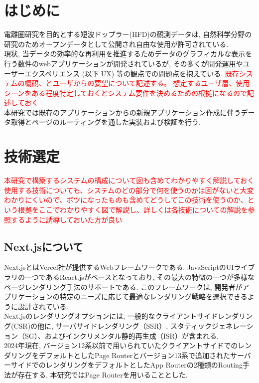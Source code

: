 \section{はじめに}
電離圏研究を目的とする短波ドップラー(HFD)の観測データは, 自然科学分野の研究のためオープンデータとして公開され自由な使用が許可されている. \\
現状, 当データの効率的な再利用を推進するためデータのグラフィカルな表示を行う数件のwebアプリケーションが開発されているが, その多くが開発運用やユーザーエクスペリエンス (以下 UX) 等の観点での問題点を抱えている. 
\textcolor{red}{既存システムの概観、とユーザからの要望について記述する。}
\textcolor{red}{想定するユーザ層、使用シーンをある程度特定しておくとシステム要件を決めるための根拠になるので記述しておく}
\\本研究では既存のアプリケーションからの新規アプリケーション作成に伴うデータ取得とページのルーティングを通した実装および検証を行う.\\


\section{技術選定}
\textcolor{red}{本研究で構築するシステムの構成について図も含めてわかりやすく解説しておく}
\textcolor{red}{使用する技術についても、システムのどの部分で何を使うのかは図がないと大変わかりにくいので、ボツになったものも含めてどうしてこの技術を使うのか、という根拠をここでわかりやすく図で解説し、詳しくは各技術についての解説を参照するように誘導しておいた方が良い}
\subsection{Next.jsについて}
Next.jsとはVercel社が提供するWebフレームワークである.
JavaScriptのUIライブラリの一つであるReact.jsがベースとなっており, その最大の特徴の一つが多様なページレンダリング手法のサポートである.
このフレームワークは, 開発者がアプリケーションの特定のニーズに応じて最適なレンダリング戦略を選択できるように設計されている. \\
Next.jsのレンダリングオプションには, 一般的なクライアントサイドレンダリング(CSR)の他に, サーバサイドレンダリング（SSR）, スタティックジェネレーション（SG）、およびインクリメンタル静的再生成（ISR）が含まれる.\\
2024年現在, バージョン12系以前で用いられていたクライアントサイドでのレンダリングをデフォルトとしたPage Routerとバージョン13系で追加されたサーバーサイドでのレンダリングをデフォルトとしたApp Routerの2種類のRouting手法が存在する.
本研究ではPage Routerを用いることとした.

